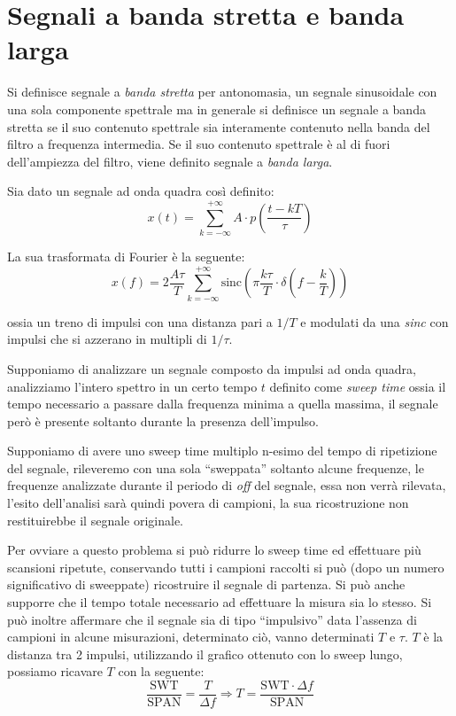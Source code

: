
\section{Segnali a banda stretta e banda larga}
Si definisce segnale a \textit{banda stretta} per antonomasia, un segnale sinusoidale
con una sola componente spettrale ma in generale
si definisce un segnale a banda stretta se il suo contenuto spettrale
sia interamente contenuto nella banda del filtro a frequenza intermedia.
Se il suo contenuto spettrale è al di fuori dell'ampiezza del filtro,
viene definito segnale a \textit{banda larga}.

Sia dato un segnale ad onda quadra così definito:
$$
x(t) = \sum_{k = -\infty}^{+\infty} A\cdot p\left(\frac{t-kT}{\tau}\right)
$$

La sua trasformata di Fourier è la seguente:
$$
x(f) = 2 \frac{A\tau}{T} \sum_{k=-\infty}^{+\infty} \text{sinc} \left(\pi \frac{k\tau}{T}\cdot  \delta\left(f-\frac{k}{T}\right)  \right)
$$

ossia un treno di impulsi con una distanza pari a $1/T$ e modulati
da una \textit{sinc} con impulsi che si azzerano in multipli di $1/\tau$.

Supponiamo di analizzare un segnale composto da impulsi ad onda quadra,
analizziamo l'intero spettro in un certo tempo $t$ definito come \textit{sweep time}
ossia il tempo necessario a passare dalla frequenza minima a quella massima,
il segnale però è presente soltanto durante la presenza dell'impulso.


Supponiamo di avere uno sweep time multiplo n-esimo
del tempo di ripetizione del segnale, rileveremo con una sola ``sweppata''
soltanto alcune frequenze, le frequenze analizzate durante il periodo di \textit{off}
del segnale, essa non verrà rilevata, l'esito dell'analisi sarà quindi povera di campioni,
la sua ricostruzione non restituirebbe il segnale originale.

Per ovviare a questo problema si può ridurre lo sweep time ed effettuare più scansioni
ripetute, conservando tutti i campioni raccolti si può (dopo un numero significativo di sweeppate)
ricostruire il segnale di partenza. Si può anche supporre che il tempo totale necessario ad effettuare
la misura sia lo stesso.
Si può inoltre affermare che il segnale sia di tipo ``impulsivo'' data l'assenza di campioni in
alcune misurazioni, determinato ciò, vanno determinati $T$ e $\tau$.
$T$ è la distanza tra 2 impulsi, utilizzando il grafico ottenuto con lo sweep lungo,
possiamo ricavare $T$ con la seguente:
$$
    \frac{\text{SWT}}{\text{SPAN}} = \frac{T}{\Delta f} \Rightarrow T = \frac{\text{SWT}\cdot\Delta f}{\text{SPAN}}
$$

